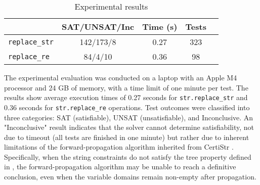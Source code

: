 \documentclass[sigplan,10pt,anonymous,review]{acmart}\settopmatter{printfolios=true,printccs=false,printacmref=false}
\begin{document}



\begin{table}[h]
  \centering
  \small
  \begin{tabular}{lcccc}
      \toprule
      & \textbf{SAT/UNSAT/Inc} & \textbf{Time (s)} & \textbf{Tests} \\
      \midrule
      \texttt{replace\_str} & 142/173/8 & 0.27 & 323\\
      \texttt{replace\_re} & 84/4/10 & 0.36 & 98\\
      \bottomrule
  \end{tabular}
  \caption{Experimental results}
  \label{tab:string_operations}
\end{table}

The experimental evaluation was conducted on a laptop with an Apple M4 processor and 24 GB of memory, with a time limit of one minute per test. 
The results show average execution times of 0.27 seconds for \texttt{str.replace\_str} and 0.36 seconds for \texttt{str.replace\_re} operations. Test outcomes were classified into three categories: SAT (satisfiable), UNSAT (unsatisfiable), and Inconclusive.
%
An "Inconclusive" result indicates that the solver cannot determine satisfiability, not due to timeout (all tests are finished in one minute) but rather due to inherent limitations of the forward-propagation algorithm inherited from CertiStr \cite{cpp/KanLRS22}. Specifically, when the string constraints do not satisfy the tree property defined in \cite{cpp/KanLRS22}, the forward-propagation algorithm may be unable to reach a definitive conclusion, even when the variable domains remain non-empty after propagation.
\end{document}
